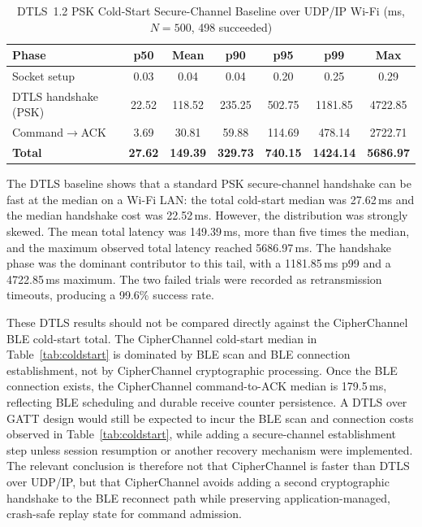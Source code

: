 \documentclass[journal]{IEEEtran}
\begin{document}
\begin{table}[!t]
\renewcommand{\arraystretch}{1.15}
\setlength{\tabcolsep}{2.5pt}
\caption{DTLS~1.2 PSK Cold-Start Secure-Channel Baseline over UDP/IP Wi-Fi (ms, $N=500$, 498 succeeded)}
\label{tab:dtls_baseline}
\centering
\scriptsize
\begin{tabular}{lcccccc}
\toprule
\textbf{Phase} & \textbf{p50} & \textbf{Mean} & \textbf{p90} & \textbf{p95} & \textbf{p99} & \textbf{Max} \\
\midrule
Socket setup            &  0.03 &   0.04 &   0.04 &   0.20 &    0.25 &    0.29 \\
DTLS handshake (PSK)    & 22.52 & 118.52 & 235.25 & 502.75 & 1181.85 & 4722.85 \\
Command$\rightarrow$ACK &  3.69 &  30.81 &  59.88 & 114.69 &  478.14 & 2722.71 \\
\midrule
\textbf{Total}          & \textbf{27.62} & \textbf{149.39} & \textbf{329.73} & \textbf{740.15} & \textbf{1424.14} & \textbf{5686.97} \\
\bottomrule
\end{tabular}
\end{table}

The DTLS baseline shows that a standard PSK secure-channel handshake can be fast at the median on a Wi-Fi LAN: the total cold-start median was 27.62\,ms and the median handshake cost was 22.52\,ms. However, the distribution was strongly skewed. The mean total latency was 149.39\,ms, more than five times the median, and the maximum observed total latency reached 5686.97\,ms. The handshake phase was the dominant contributor to this tail, with a 1181.85\,ms p99 and a 4722.85\,ms maximum. The two failed trials were recorded as retransmission timeouts, producing a 99.6\% success rate.

These DTLS results should not be compared directly against the CipherChannel BLE cold-start total. The CipherChannel cold-start median in Table~\ref{tab:coldstart} is dominated by BLE scan and BLE connection establishment, not by CipherChannel cryptographic processing. Once the BLE connection exists, the CipherChannel command-to-ACK median is 179.5\,ms, reflecting BLE scheduling and durable receive counter persistence. A DTLS over GATT design would still be expected to incur the BLE scan and connection costs observed in Table~\ref{tab:coldstart}, while adding a secure-channel establishment step unless session resumption or another recovery mechanism were implemented. The relevant conclusion is therefore not that CipherChannel is faster than DTLS over UDP/IP, but that CipherChannel avoids adding a second cryptographic handshake to the BLE reconnect path while preserving application-managed, crash-safe replay state for command admission.
\end{document}
